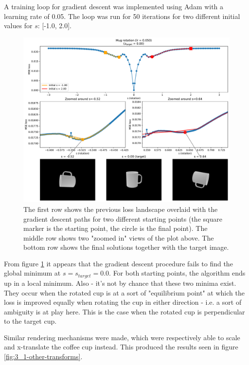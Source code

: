 A training loop for gradient descent was implemented using Adam with a learning rate of 0.05. The loop was run for 50 iterations for two different initial values for $s$: [-1.0, 2.0].

\begin{figure}[H]
    \centering
    \includegraphics[width=1.0\textwidth]{figures/3_1-mse-gd-rotation-optimization.pdf}
    \caption{The first row shows the previous loss landscape overlaid with the gradient descent paths for two different starting points (the square marker is the starting point, the circle is the final point). The middle row shows two "zoomed in" views of the plot above. The bottom row shows the final solutions together with the target image.}
    \label{fig:3_1-mse-gd-optimization}
\end{figure}
From figure \ref{fig:3_1-mse-gd-optimization} it appears that the gradient descent procedure fails to find the global minimum at $s = s_{target} = 0.0$. For both starting points, the algorithm ends up in a local minimum. Also - it's not by chance that these two minima exist. They occur when the rotated cup is at a sort of "equilibrium point" at which the loss is improved equally when rotating the cup in either direction - i.e. a sort of ambiguity is at play here. This is the case when the rotated cup is perpendicular to the target cup.

Similar rendering mechanisms were made, which were respectively able to scale and x-translate the coffee cup instead. This produced the results seen in figure \ref{fig:3_1-other-transforms}.

